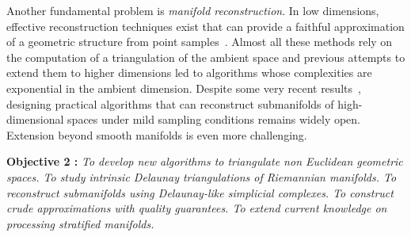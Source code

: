 Another fundamental problem is {\em manifold reconstruction}.  In low dimensions, effective reconstruction techniques exist that can provide a faithful approximation of a geometric structure from point samples~\cite{dey-csr-2007}. %
Almost all these methods rely on the computation of a triangulation of the ambient space and previous attempts to extend them to higher dimensions led to algorithms whose complexities are exponential in the ambient dimension.  Despite some very recent results~\cite{geometrica-7142i}, designing practical algorithms that can reconstruct submanifolds of high-dimensional spaces under mild sampling conditions remains widely open. Extension beyond smooth manifolds 
is even more challenging.


\vspace{2mm}

{\bf Objective 2 :}  {\em To   develop new algorithms to {\em  triangulate non Euclidean geometric spaces}. To study intrinsic Delaunay triangulations of Riemannian manifolds.  To reconstruct submanifolds using Delaunay-like simplicial complexes. To construct crude approximations 
with quality guarantees. To extend current knowledge on processing stratified manifolds. }

